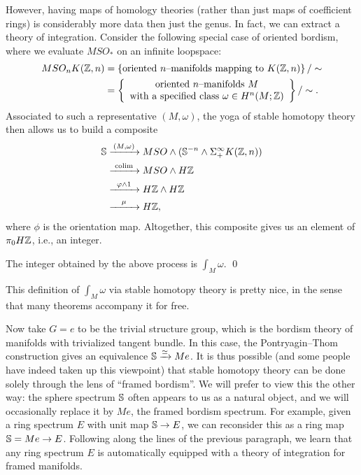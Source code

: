 However, having maps of homology theories (rather than just maps of coefficient rings) is considerably more data then just the genus.  In fact, we can extract a theory of integration.  Consider the following special case of oriented bordism, where we evaluate $MSO_*$ on an infinite loopspace:
\begin{align*}
MSO_n K(\Z, n) & = \left\{ \text{oriented $n$--manifolds mapping to $K(\Z, n)$} \right\} / \sim \\
& = \left\{ \begin{array}{c}\text{oriented $n$--manifolds $M$} \\ \text{with a specified class $\omega \in H^n(M; \Z)$} \end{array}\right\} / \sim.
\end{align*}
Associated to such a representative $(M, \omega)$, the yoga of stable homotopy theory then allows us to build a composite
\begin{align*}
\S & \xrightarrow{\mathmakebox[2.5em]{(M, \omega)}} MSO \sm (\S^{-n} \sm \Susp^\infty_+ K(\Z, n)) \\ 
& \xrightarrow{\mathmakebox[2.5em]{\colim}} MSO \sm H\Z \\
& \xrightarrow{\mathmakebox[2.5em]{\phi \sm 1}} H\Z \sm H\Z \\
& \xrightarrow{\mathmakebox[2.5em]{\mu}} H\Z,
\end{align*}
where $\phi$ is the orientation map.  Altogether, this composite gives us an element of $\pi_0 H\Z$, i.e., an integer.

\begin{lemma}
The integer obtained by the above process is $\int_M \omega$. \qed
\end{lemma}

\noindent This definition of $\int_M \omega$ via stable homotopy theory is pretty nice, in the sense that many theorems accompany it for free.

Now take $G = e$ to be the trivial structure group, which is the bordism theory of manifolds with trivialized tangent bundle.  In this case, the Pontryagin--Thom construction gives an equivalence $\S \xrightarrow{\simeq} Me$.  It is thus possible (and some people have indeed taken up this viewpoint) that stable homotopy theory can be done solely through the lens of ``framed bordism''.  We will prefer to view this the other way: the sphere spectrum $\S$ often appears to us as a natural object, and we will occasionally replace it by $Me$, the framed bordism spectrum.  For example, given a ring spectrum $E$ with unit map $\S \to E$, we can reconsider this as a ring map $\S = Me \to E$.  Following along the lines of the previous paragraph, we learn that any ring spectrum $E$ is automatically equipped with a theory of integration for framed manifolds.

